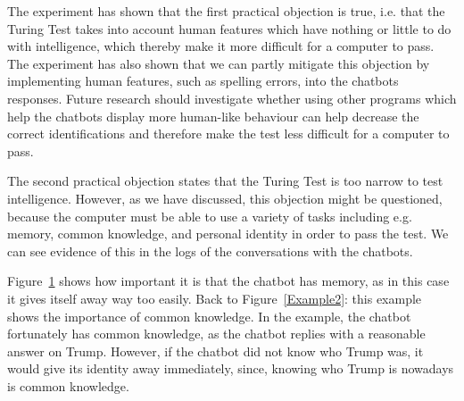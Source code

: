 The experiment has shown that the first practical objection is true, i.e. that the Turing Test takes into account human features which have nothing or little to do with intelligence, which thereby make it more difficult for a computer to pass. The experiment has also shown that we can partly mitigate this objection by implementing human features, such as spelling errors, into the chatbots responses. Future research should investigate whether using other programs which help the chatbots display more human-like behaviour can help decrease the correct identifications and therefore make the test less difficult for a computer to pass.

The second practical objection states that the Turing Test is too narrow to test intelligence. However, as we have discussed, this objection might be questioned, because the computer must be able to use a variety of tasks including e.g. memory, common knowledge, and personal identity in order to pass the test. We can see evidence of this in the logs of the conversations with the chatbots.

\begin{figure}[ht]
   \begin{center}
   \end{center}
   \caption{}
   \label{Example5}
\end{figure}

Figure~\ref{Example5} shows how important it is that the chatbot has memory, as in this case it gives itself away way too easily. Back to Figure~\ref{Example2}: this example shows the importance of common knowledge. In the example, the chatbot fortunately has common knowledge, as the chatbot replies with a reasonable answer on Trump. However, if the chatbot did not know who Trump was, it would give its identity away immediately, since, knowing who Trump is nowadays is common knowledge.

